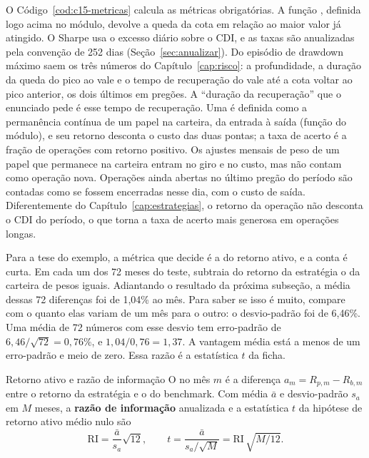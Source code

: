 O Código~\ref{cod:c15-metricas} calcula as métricas obrigatórias. A função , definida logo acima no módulo, devolve a queda da cota em relação ao maior valor já atingido. O Sharpe usa o excesso diário sobre o CDI, e as taxas são anualizadas pela convenção de 252 dias (Seção~\ref{sec:anualizar}). Do episódio de drawdown máximo saem os três números do Capítulo~\ref{cap:risco}: a profundidade, a duração da queda do pico ao vale e o tempo de recuperação do vale até a cota voltar ao pico anterior, os dois últimos em pregões. A ``duração da recuperação'' que o enunciado pede é esse tempo de recuperação. Uma  é definida como a permanência contínua de um papel na carteira, da entrada à saída (função  do módulo), e seu retorno desconta o custo das duas pontas; a taxa de acerto é a fração de operações com retorno positivo. Os ajustes mensais de peso de um papel que permanece na carteira entram no giro e no custo, mas não contam como operação nova. Operações ainda abertas no último pregão do período são contadas como se fossem encerradas nesse dia, com o custo de saída. Diferentemente do Capítulo~\ref{cap:estrategias}, o retorno da operação não desconta o CDI do período, o que torna a taxa de acerto mais generosa em operações longas.



Para a tese do exemplo, a métrica que decide é a do retorno ativo, e a conta é curta. Em cada um dos 72 meses do teste, subtraia do retorno da estratégia o da carteira de pesos iguais. Adiantando o resultado da próxima subseção, a média dessas 72 diferenças foi de 1,04\% ao mês. Para saber se isso é muito, compare com o quanto elas variam de um mês para o outro: o desvio-padrão foi de 6,46\%. Uma média de 72 números com esse desvio tem erro-padrão de $6,46/\sqrt{72} = 0,76\%$, e $1,04/0,76 = 1,37$. A vantagem média está a menos de um erro-padrão e meio de zero. Essa razão é a estatística $t$ da ficha.

\begin{definicao}{Retorno ativo e razão de informação}
O  no mês $m$ é a diferença $a_m = R_{p,m} - R_{b,m}$ entre o retorno da estratégia e o do benchmark. Com média $\bar a$ e desvio-padrão $s_a$ em $M$ meses, a \textbf{razão de informação} anualizada e a estatística $t$ da hipótese de retorno ativo médio nulo são
\begin{equation}
  \mathrm{RI} = \frac{\bar a}{s_a}\sqrt{12} , \qquad
  t = \frac{\bar a}{s_a / \sqrt{M}} = \mathrm{RI}\,\sqrt{M/12} .
  \label{eq:c15-ri}
\end{equation}
\end{definicao}

